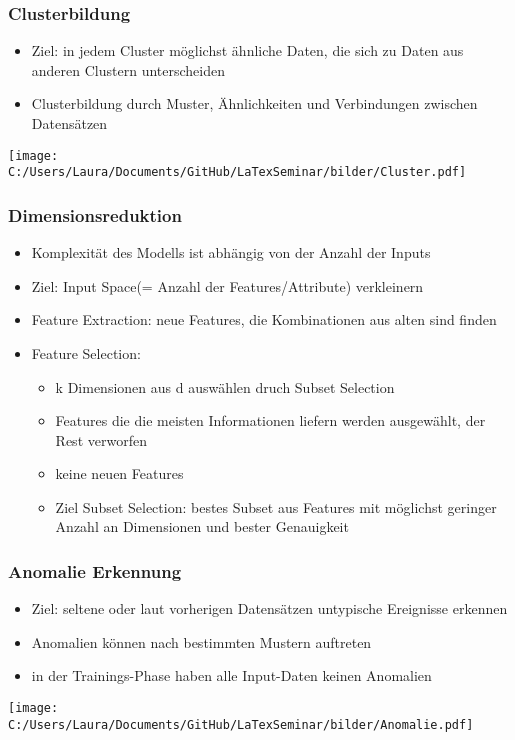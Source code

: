 \documentclass[11pt]{beamer}
\begin{document}
	\begin{frame}
		\frametitle{Clusterbildung}
		\begin{itemize}
			\item Ziel: in jedem Cluster möglichst ähnliche Daten, die sich zu Daten aus anderen Clustern unterscheiden
			\item Clusterbildung durch Muster, Ähnlichkeiten und Verbindungen zwischen Datensätzen
		\end{itemize}
		\texttt{[image: C:/Users/Laura/Documents/GitHub/LaTexSeminar/bilder/Cluster.pdf]}
	\end{frame}
	
	\begin{frame}
		\frametitle{Dimensionsreduktion}
		\begin{itemize}
			\item Komplexität des Modells ist abhängig von der Anzahl der Inputs
			\item Ziel: Input Space(= Anzahl der Features/Attribute) verkleinern
			\item Feature Extraction: neue Features, die Kombinationen aus alten sind finden 
			\item Feature Selection: 
				\begin{itemize}
					\item k Dimensionen aus d auswählen druch Subset Selection
					\item Features die die meisten Informationen liefern werden ausgewählt, der Rest verworfen
					\item keine neuen Features
					\item Ziel Subset Selection: bestes Subset aus Features mit möglichst geringer Anzahl an Dimensionen und bester Genauigkeit
				\end{itemize}
		\end{itemize}  
	\end{frame}
	
	\begin{frame}
		\frametitle{Anomalie Erkennung}
		\begin{itemize}
			\item Ziel: seltene oder laut vorherigen Datensätzen untypische Ereignisse erkennen
			\item Anomalien können nach bestimmten Mustern auftreten
			\item in der Trainings-Phase haben alle Input-Daten keinen Anomalien
		\end{itemize}
		\texttt{[image: C:/Users/Laura/Documents/GitHub/LaTexSeminar/bilder/Anomalie.pdf]}
	\end{frame}
	
\end{document}
